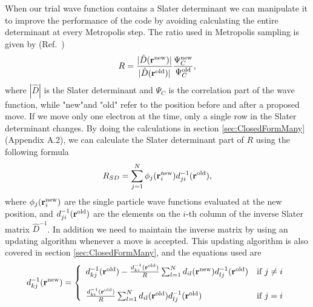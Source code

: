 \documentclass[../main.tex]{subfiles}
\begin{document}
When our trial wave function contains a Slater determinant we can manipulate it to improve the performance of the code by avoiding calculating the entire determinant at every Metropolis step. The ratio used in Metropolis sampling is given by (Ref.~\cite{FYS4411-LectureNotes})
\begin{align}
    R = \frac{|\hat{D}({\bf r}^{\textrm{new}})|}{|\hat{D}({\bf r}^{\textrm{old}})|} \frac{\Psi_C^{\textrm{new}}}{\Psi_C^{\textrm{old}}},
\end{align}
where $|\hat{D}|$ is the Slater determinant and $\Psi_C$ is the correlation part of the wave function, while "new"and "old" refer to the position before and after a proposed move. If we move only one electron at the time, only a single row in the Slater determinant changes. By doing the calculations in section \ref{sec:ClosedFormMany}(Appendix A.2), we can calculate the Slater determinant part of $R$ using the following formula
\begin{align}\label{eq:MetropolisRatioSD}
    R_{SD} = \sum_{j=1}^N \phi_j({\bf r}_i^{\textrm{new}}) d_{ji}^{-1}({\bf r}^{\textrm{old}}),
\end{align}
where $\phi_j({\bf r}_i^{\textrm{new}})$ are the single particle wave functions evaluated at the new position, and $d_{ji}^{-1}({\bf r}^{\textrm{old}})$ are the elements on the $i$-th column of the inverse Slater matrix $\hat{D}^{-1}$. In addition we need to maintain the inverse matrix by using an updating algorithm whenever a move is accepted. This updating algorithm is also covered in section \ref{sec:ClosedFormMany}, and the equations used are 
\begin{align}
    d^{-1}_{kj}(\mathbf{r}^{\textrm{new}}) = \left\{\begin{array}{l l}
  d^{-1}_{kj}(\mathbf{r}^{\textrm{old}}) - \frac{d^{-1}_{ki}(\mathbf{r}^{\textrm{old}})}{R} \sum_{l=1}^{N} d_{il}(\mathbf{r}^{\textrm{new}})  d^{-1}_{lj}(\mathbf{r}^{\textrm{old}}) & \mbox{if $j \neq i$}\nonumber \\ \\
 \frac{d^{-1}_{ki}(\mathbf{r}^{\textrm{old}})}{R} \sum_{l=1}^{N} d_{il}(\mathbf{r}^{\textrm{old}}) d^{-1}_{lj}(\mathbf{r}^{\textrm{old}}) & \mbox{if $j=i$}
\end{array} \right.
\end{align}
\end{document}
